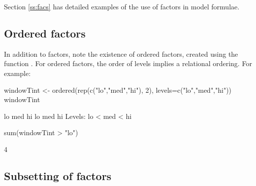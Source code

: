 Section \ref{ss:facs} has detailed examples of the use of factors
in model formulae.

\subsection*{Ordered factors}
In addition to factors, note the existence of ordered factors, created
using the function .  For ordered factors, the order
of levels implies a relational ordering.  For example:
\begin{Schunk}
\begin{Sinput}
windowTint <- ordered(rep(c("lo","med","hi"), 2),
                      levels=c("lo","med","hi"))
windowTint
\end{Sinput}
\begin{Soutput}
[1] lo  med hi  lo  med hi 
Levels: lo < med < hi
\end{Soutput}
\begin{Sinput}
sum(windowTint > "lo")
\end{Sinput}
\begin{Soutput}
[1] 4
\end{Soutput}
\end{Schunk}

\subsection*{Subsetting of factors}

